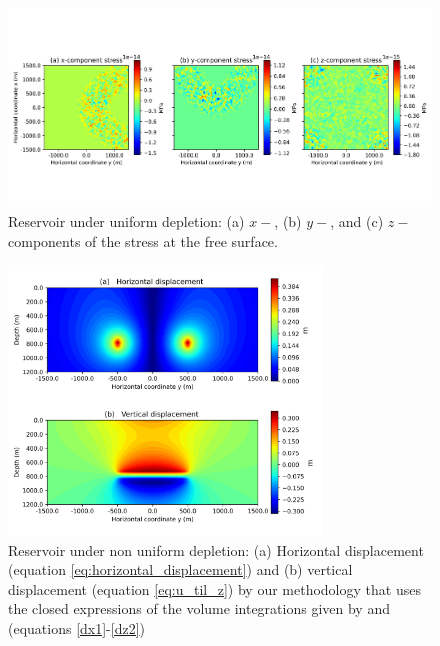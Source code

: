 \documentclass[journal abbreviation, manuscript]{copernicus}
\begin{document}
\begin{figure}[h]
\includegraphics[width=12cm]{Fig/Figure_Null_stress.png}
\caption{Reservoir under uniform depletion: (a) $x-$, (b) $y-$, and (c) $z-$ components of the stress at the free surface.}
\label{fig:Null_stress}
\end{figure}




\begin{figure}[h]
\includegraphics[width=8.3cm]{Fig/Figure_Displacement_non_uniform_depletion.png}
\caption{Reservoir under non uniform depletion: (a) Horizontal displacement (equation \ref{eq:horizontal_displacement}) and (b) vertical displacement (equation \ref{eq:u_til_z}) by our methodology that uses the closed expressions of the volume integrations given by \cite{Nagyetal2000} and \cite{Nagyetal2002} (equations \ref{dx1}-\ref{dz2})}
\label{fig:displacement_non_uniform_depletion}
\end{figure}
\end{document}
